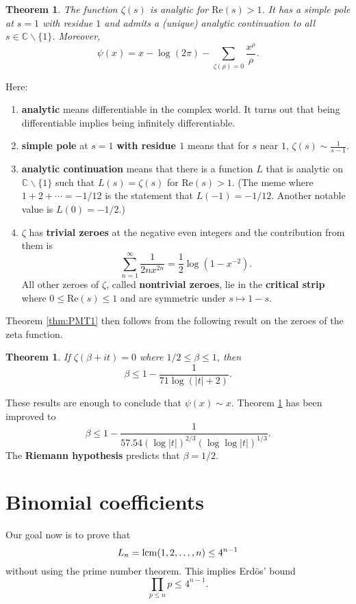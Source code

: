\documentclass{article}
\def\lcm{{\rm lcm}}
\def\C{{\mathbb C}}
\newtheorem{theorem}[subsection]{Theorem}
\begin{document}
\begin{theorem}\label{thm:psis}
    The function $\zeta(s)$ is analytic for $\text{Re}(s)>1$. It has a simple pole at $s = 1$ with residue $1$ and admits a (unique) analytic continuation to all $s\in\C\backslash\{1\}$. Moreover, 
    $$\psi(x) = x - \log(2\pi) - \sum_{\zeta(\rho) = 0}\frac{x^\rho}{\rho}.$$
\end{theorem}
Here:
\begin{enumerate}
    \item \textbf{analytic} means differentiable in the complex world. It turns out that being differentiable implies being infinitely differentiable.
    \item \textbf{simple pole} at $s=1$ \textbf{with residue $1$} means that for $s$ near $1$, $\zeta(s)\sim\frac{1}{s-1}.$
    \item \textbf{analytic continuation} means that there is a function $L$ that is analytic on $\C\backslash\{1\}$ such that $L(s) = \zeta(s)$ for $\text{Re}(s)>1$. (The meme where $1+2+\cdots = -1/12$ is the statement that $L(-1) = -1/12$. Another notable value is $L(0) = -1/2$.)
    \item $\zeta$ has \textbf{trivial zeroes} at the negative even integers and the contribution from them is $$\sum_{n=1}^\infty \frac{1}{2nx^{2n}} = \frac12\log(1 - x^{-2}).$$
    All other zeroes of $\zeta$, called \textbf{nontrivial zeroes}, lie in the \textbf{critical strip} where $0 \leq \text{Re}(s) \leq 1$ and are symmetric under $s\mapsto 1-s$.
\end{enumerate}

Theorem \ref{thm:PMT1} then follows from the following result on the zeroes of the zeta function.

\begin{theorem}\label{thm:zerofree}
    If $\zeta(\beta+ it) = 0$ where $1/2\leq\beta\leq 1$, then $$\beta \leq 1 - \frac{1}{71\log(|t|+2)}.$$
\end{theorem}

These results are enough to conclude that $\psi(x)\sim x$. Theorem \ref{thm:zerofree} has been improved to
$$\beta \leq 1 - \frac{1}{57.54(\log |t|)^{2/3}(\log\log|t|)^{1/3}}.$$
The \textbf{Riemann hypothesis} predicts that $\beta = 1/2$.

\section{Binomial coefficients}

Our goal now is to prove that
$$L_n = \lcm(1,2,\ldots,n) \leq 4^{n-1}$$
without using the prime number theorem. This implies Erd\"{o}s' bound
$$\prod_{p\leq n}p \leq 4^{n-1}.$$
\end{document}
